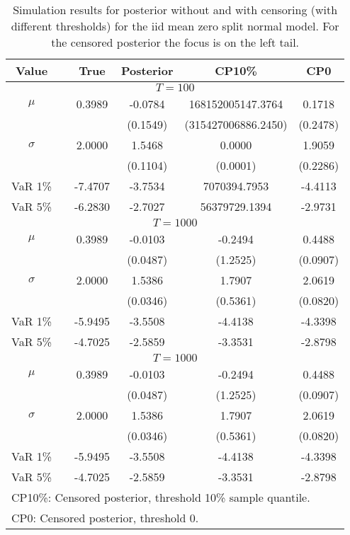 { \renewcommand{\arraystretch}{1.2} 
\begin{table} 
\center 
\begin{tabular}{cc cccc} 
Value & & True & Posterior & CP10\% & CP0 \\ \hline 
\hline 
\multicolumn{6}{c}{$T =100$}  \\ 
\hline 
$\mu$&& 0.3989 & -0.0784 & 168152005147.3764 & 0.1718  \\ 
&&   & (0.1549) & (315427006886.2450) & (0.2478)  \\ 
$\sigma$&& 2.0000 & 1.5468 & 0.0000 & 1.9059  \\ 
&&   & (0.1104) & (0.0001) & (0.2286)  \\ 
VaR 1\% && -7.4707 & -3.7534 & 7070394.7953 & -4.4113  \\ 
VaR 5\% && -6.2830 & -2.7027 & 56379729.1394 & -2.9731  \\ 
\hline 
\multicolumn{6}{c}{$T =1000$}  \\ 
\hline 
$\mu$&& 0.3989 & -0.0103 & -0.2494 & 0.4488  \\ 
&&   & (0.0487) & (1.2525) & (0.0907)  \\ 
$\sigma$&& 2.0000 & 1.5386 & 1.7907 & 2.0619  \\ 
&&   & (0.0346) & (0.5361) & (0.0820)  \\ 
VaR 1\% && -5.9495 & -3.5508 & -4.4138 & -4.3398  \\ 
VaR 5\% && -4.7025 & -2.5859 & -3.3531 & -2.8798  \\ 
\hline 
\multicolumn{6}{c}{$T =1000$}  \\ 
\hline 
$\mu$&& 0.3989 & -0.0103 & -0.2494 & 0.4488  \\ 
&&   & (0.0487) & (1.2525) & (0.0907)  \\ 
$\sigma$&& 2.0000 & 1.5386 & 1.7907 & 2.0619  \\ 
&&   & (0.0346) & (0.5361) & (0.0820)  \\ 
VaR 1\% && -5.9495 & -3.5508 & -4.4138 & -4.3398  \\ 
VaR 5\% && -4.7025 & -2.5859 & -3.3531 & -2.8798  \\ 
\hline 
\multicolumn{6}{l}{\footnotesize{CP10\%: Censored posterior, threshold 10\% sample quantile.}}  \\ 
\multicolumn{6}{l}{\footnotesize{CP0: Censored posterior, threshold 0.}} 
\end{tabular}
 \caption{Simulation results for posterior without and with censoring (with different thresholds) for the iid mean zero split normal model. For the censored posterior the focus is on the left tail. } 
\label{tab:iid}  
\end{table}
}